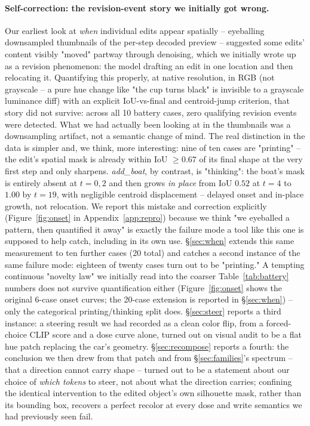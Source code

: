 \documentclass[10pt,twocolumn,letterpaper]{article}
\begin{document}
\paragraph{Self-correction: the revision-event story we initially got
wrong.} Our earliest look at \emph{when} individual edits appear
spatially -- eyeballing downsampled thumbnails of the per-step decoded
preview -- suggested some edits' content visibly "moved" partway
through denoising, which we initially wrote up as a revision
phenomenon: the model drafting an edit in one location and then
relocating it. Quantifying this properly, at native resolution, in RGB
(not grayscale -- a pure hue change like "the cup turns black" is
invisible to a grayscale luminance diff) with an explicit IoU-vs-final
and centroid-jump criterion, that story did not survive: across all 10
battery cases, zero qualifying revision events were detected. What we
had actually been looking at in the thumbnails was a downsampling
artifact, not a semantic change of mind. The real distinction in the
data is simpler and, we think, more interesting: nine of ten cases are
"printing" -- the edit's spatial mask is already within IoU $\ge0.67$ of
its final shape at the very first step and only sharpens.
\emph{add\_boat}, by contrast, is "thinking": the boat's mask is
entirely absent at $t{=}0,2$ and then grows \emph{in place} from IoU
$0.52$ at $t{=}4$ to $1.00$ by $t{=}19$, with negligible centroid
displacement -- delayed onset and in-place growth, not relocation. We
report this
mistake and correction explicitly (Figure~\ref{fig:onset} in
Appendix~\ref{app:repro}) because we think "we eyeballed a pattern,
then quantified it away" is exactly the failure mode a tool like this
one is supposed to help catch, including in its own use. \S\ref{sec:when}
extends this same measurement to ten further cases (20 total) and catches
a second instance of the same failure mode: eighteen of twenty cases turn
out to be "printing." A tempting continuous "novelty law" we
initially read into the coarser Table~\ref{tab:battery} numbers does not
survive quantification either (Figure~\ref{fig:onset} shows the original
6-case onset curves; the 20-case extension is reported in
\S\ref{sec:when}) -- only the categorical printing/thinking split does.
\S\ref{sec:steer} reports a third instance: a steering result we had
recorded as a clean color flip, from a forced-choice CLIP score and a
dose curve alone, turned out on visual audit to be a flat hue patch
replacing the car's geometry. \S\ref{sec:recompose} reports a fourth: the
conclusion we then drew from that patch and from \S\ref{sec:families}'s
spectrum -- that a direction cannot carry shape -- turned out to be a
statement about our choice of \emph{which tokens} to steer, not about
what the direction carries; confining the identical intervention to the
edited object's own silhouette mask, rather than its bounding box,
recovers a perfect recolor at every dose and write semantics we had
previously seen fail.
\end{document}
